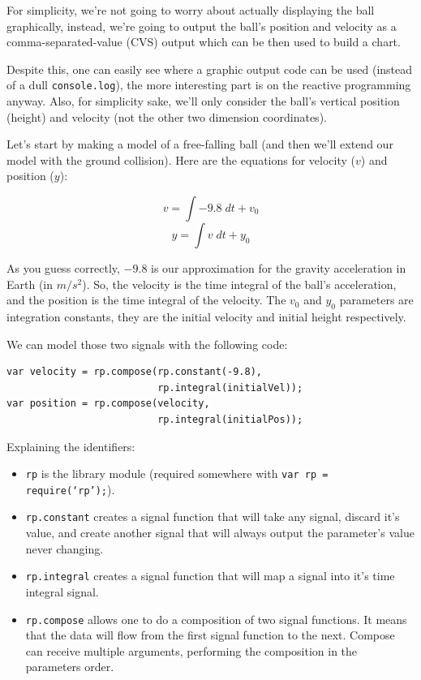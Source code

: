 \documentclass[notitlepage]{article}
\begin{document}
For simplicity, we're not going to worry about actually displaying the ball
graphically, instead, we're going to output the ball's position and velocity as
a comma-separated-value (CVS) output \- which can be then used to build a
chart.

Despite this, one can easily see where a graphic output code can be used
(instead of a dull \texttt{console.log}), the more interesting part is on the
reactive programming anyway. Also, for simplicity sake, we'll only consider the
ball's vertical position (height) and velocity (not the other two dimension
coordinates).

Let's start by making a model of a free-falling ball (and then we'll extend our
model with the ground collision). Here are the equations for velocity ($v$) and
position ($y$):

\begin{equation}
    v = \int -9.8 \; dt + v_0
\end{equation}
\begin{equation}
    y = \int v \; dt + y_0
\end{equation}

As you guess correctly, $-9.8$ is our approximation for the gravity
acceleration in Earth (in $m / s^2$). So, the velocity is the time integral of
the ball's acceleration, and the position is the time integral of the velocity.
The $v_0$ and $y_0$ parameters are integration constants, they are the initial
velocity and initial height respectively.

We can model those two signals with the following code:

\begin{lstlisting}
var velocity = rp.compose(rp.constant(-9.8),
                          rp.integral(initialVel));
var position = rp.compose(velocity,
                          rp.integral(initialPos));
\end{lstlisting}

Explaining the identifiers:

\begin{itemize}
    \item \texttt{rp} is the library module (required somewhere with
        \texttt{var rp = require(`rp');}).
    \item \texttt{rp.constant} creates a signal function that will take any
        signal, discard it's value, and create another signal that will always
        output the parameter's value never changing.
    \item \texttt{rp.integral} creates a signal function that will map a signal
        into it's time integral signal.
    \item \texttt{rp.compose} allows one to do a composition of two signal
        functions. It means that the data will flow from the first signal
        function to the next. Compose can receive multiple arguments,
        performing the composition in the parameters order.
\end{itemize}
\end{document}
